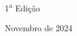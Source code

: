 \begin{center}
  \vspace*{4cm}

  \LARGE 1\textsuperscript{a} Edição

  \bigskip

  \Large Novembro de 2024
\end{center}
